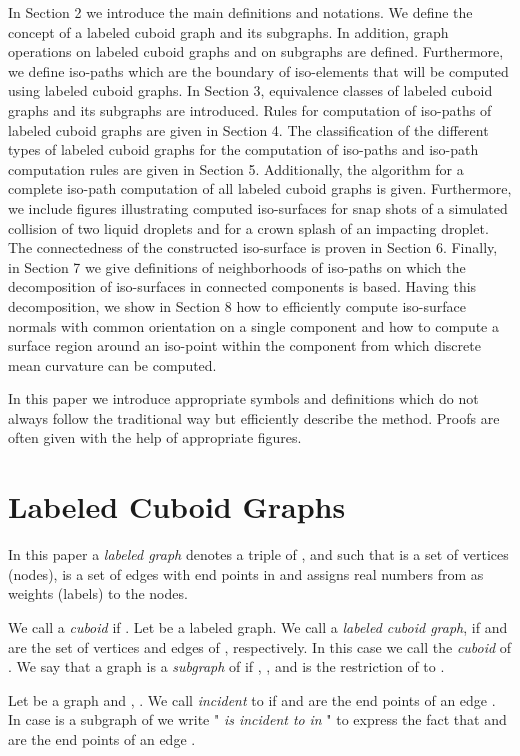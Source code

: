 \documentclass[a4paper,11pt]{article}
\begin{document}
\noindent In Section 2 we introduce the main definitions and notations. We define
the concept of a labeled cuboid graph and its subgraphs. In addition, graph operations on
labeled cuboid graphs and on subgraphs are defined. Furthermore, we define iso-paths which
are the boundary of iso-elements that will be computed using labeled cuboid graphs. In Section 3,
equivalence classes of labeled cuboid graphs and its subgraphs are introduced. Rules for computation
of iso-paths of labeled cuboid graphs are given in Section 4. The classification of the different
types of labeled cuboid graphs for the computation of iso-paths and iso-path computation rules are
given in Section 5. Additionally, the algorithm for a complete iso-path computation of all labeled
cuboid graphs  is given. Furthermore, we include figures illustrating computed iso-surfaces
for snap shots of a simulated collision of two liquid droplets and
for a crown splash of an impacting droplet. The connectedness of the constructed iso-surface is proven
in Section 6. Finally, in Section 7 we give definitions of neighborhoods of iso-paths on which
the decomposition of iso-surfaces in connected components is based. Having this decomposition, we
show in Section 8 how to efficiently compute iso-surface normals with common orientation on a single component
and how to compute a surface region around an iso-point within the component from which discrete mean curvature
can be computed.

In this paper we introduce appropriate symbols and definitions which do not always follow the traditional way
but efficiently describe the method. Proofs are often given with the help of appropriate figures.
\newpage
\section{Labeled Cuboid Graphs}
In this paper a {\it labeled graph}  denotes a triple  of
,  and  such
that  is a set of vertices (nodes),  is a set of edges with end points in  and
 assigns real numbers from  as weights (labels) to the nodes.

We call  a {\it cuboid} if .
Let  be a labeled graph. We call  a {\it labeled cuboid graph},
if  and  are the set of vertices and edges of ,
respectively. In this case we call  the {\it cuboid} of . We say that a graph
 is a {\it subgraph} of  if ,
, and  is the restriction of  to .

Let  be a graph and , . We call  {\it incident} to 
if  and  are the end points of an edge . In case  is
a subgraph of  we write " {\it is incident to}  {\it in} " to
express the fact that  and  are the end points of an edge .
\end{document}
